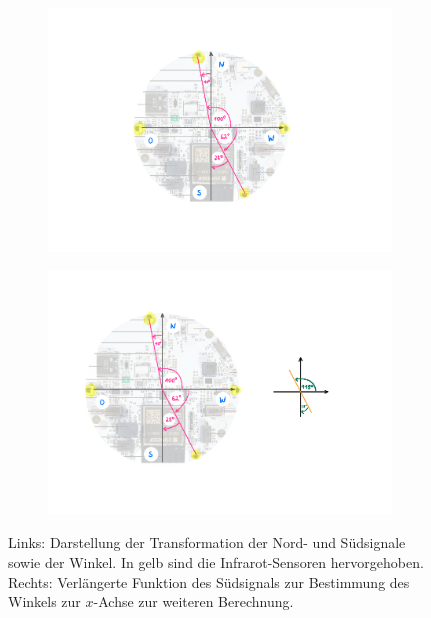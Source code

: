 \begin{figure}[h]
    \centering
    \begin{subfigure}[c]{0.6\textwidth}
        \centering
        \includegraphics[width=\textwidth]{../assets/angle_determination_adjustment.pdf}
    \end{subfigure}
    \begin{subfigure}[c]{0.3\textwidth}
        \includegraphics[width=\textwidth]{../assets/angle_determination_adjustment_south_angle.pdf}
    \end{subfigure}
    \caption{Links: Darstellung der Transformation der Nord- und Südsignale sowie der Winkel. In gelb sind die Infrarot\hyphen Sensoren hervorgehoben. Rechts: Verlängerte Funktion des Südsignals zur Bestimmung des Winkels zur $x$-Achse zur weiteren Berechnung.}
    \label{fig:angle-determination-adjustment}
\end{figure}

